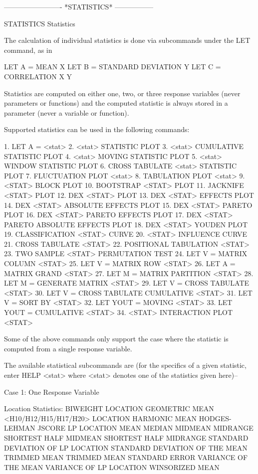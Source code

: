  
 
 


-------------------------  *STATISTICS*  -----------------
 
STATISTICS
Statistics
 
The calculation of individual statistics is done via subcommands under
the LET command, as in
 
   LET A = MEAN X
   LET B = STANDARD DEVIATION Y
   LET C = CORRELATION X Y
 
Statistics are computed on either one, two, or three response variables
(never parameters or functions) and the computed statistic is always
stored in a parameter (never a variable or function).

Supported statistics can be used in the following commands:

   1. LET A = <stat>
   2. <stat> STATISTIC PLOT
   3. <stat> CUMULATIVE STATISTIC PLOT
   4. <stat> MOVING STATISTIC PLOT
   5. <stat> WINDOW STATISTIC PLOT
   6. CROSS TABULATE <stat> STATISTIC PLOT
   7. FLUCTUATION PLOT <stat>
   8. TABULATION PLOT <stat>
   9. <STAT> BLOCK PLOT
  10. BOOTSTRAP <STAT> PLOT
  11. JACKNIFE <STAT> PLOT
  12. DEX <STAT> PLOT
  13. DEX <STAT> EFFECTS PLOT
  14. DEX <STAT> ABSOLUTE EFFECTS PLOT
  15. DEX <STAT> PARETO PLOT
  16. DEX <STAT> PARETO EFFECTS PLOT
  17. DEX <STAT> PARETO ABSOLUTE EFFECTS PLOT
  18. DEX <STAT> YOUDEN PLOT
  19. CLASSIFICATION <STAT> CURVE
  20. <STAT> INFLUENCE CURVE
  21. CROSS TABULATE <STAT>
  22. POSITIONAL TABULATION <STAT>
  23. TWO SAMPLE <STAT> PERMUTATION TEST
  24. LET V = MATRIX COLUMN <STAT>
  25. LET V = MATRIX ROW <STAT>
  26. LET A = MATRIX GRAND <STAT>
  27. LET M = MATRIX PARTITION <STAT>
  28. LET M = GENERATE MATRIX <STAT>
  29. LET V = CROSS TABULATE <STAT>
  30. LET V = CROSS TABULATE CUMULATIVE <STAT>
  31. LET V = SORT BY <STAT>
  32. LET YOUT = MOVING <STAT>
  33. LET YOUT = CUMULATIVE <STAT>
  34. <STAT> INTERACTION PLOT <STAT>

Some of the above commands only support the case where the
statistic is computed from a single response variable.

The available statistical subcommands are (for the specifics of a
given statistic, enter HELP <stat> where <stat> denotes one of the
statistics given here)--
 
Case 1: One Response Variable

Location Statistics:
   BIWEIGHT LOCATION
   GEOMETRIC MEAN
   <H10/H12/H15/H17/H20> LOCATION
   HARMONIC MEAN
   HODGES-LEHMAN
   JSCORE
   LP LOCATION
   MEAN
   MEDIAN
   MIDMEAN
   MIDRANGE
   SHORTEST HALF MIDMEAN
   SHORTEST HALF MIDRANGE
   STANDARD DEVIATION OF LP LOCATION
   STANDARD DEVIATION OF THE MEAN
   TRIMMED MEAN
   TRIMMED MEAN STANDARD ERROR
   VARIANCE OF THE MEAN
   VARIANCE OF LP LOCATION
   WINSORIZED MEAN

